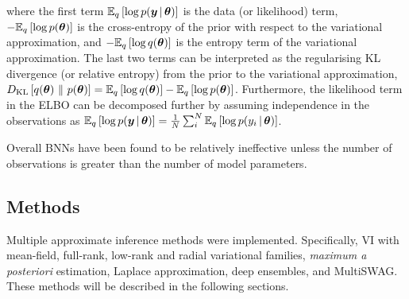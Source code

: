 \documentclass[10pt,a4paper,twocolumn]{article}
\begin{document}
where the first term \(\mathbb{E}_{q}\left[\log p(\bm y \, | \, \bm \theta)\right]\) is the data (or likelihood) term, \(-\mathbb{E}_{q}\left[\log p(\bm \theta)\right]\) is the cross-entropy of the prior with respect to the variational approximation, and \(-\mathbb{E}_{q}\left[\log q(\bm \theta)\right]\) is the entropy term of the variational approximation.
The last two terms can be interpreted as the regularising KL divergence (or relative entropy) from the prior to the variational approximation, \(D_{\mathrm{KL}}\left[q(\bm \theta)\ \lVert\ p(\bm \theta)\right] = \mathbb{E}_{q}\left[\log q(\bm \theta)\right] - \mathbb{E}_{q}\left[\log p(\bm \theta)\right]\).
Furthermore, the likelihood term in the ELBO can be decomposed further by assuming independence in the observations as \(\mathbb{E}_{q}\left[\log p(\bm y \, | \, \bm \theta)\right] = \frac{1}{N} \sum^N_i \mathbb{E}_{q}\left[\log p(y_i \, | \, \bm \theta)\right]\).

Overall BNNs have been found to be relatively ineffective unless the number of observations is greater than the number of model parameters.

\subsection{Methods}\label{ssec:methods}

Multiple approximate inference methods were implemented.
Specifically, VI with mean-field, full-rank, low-rank and radial variational families, \emph{maximum a posteriori} estimation, Laplace approximation, deep ensembles, and MultiSWAG.
These methods will be described in the following sections.
\end{document}
